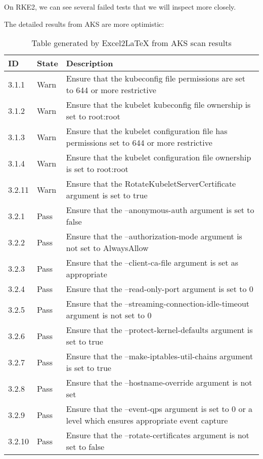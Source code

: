 On RKE2, we can see several failed tests that we will inspect more closely.

The detailed results from AKS are more optimistic:
\pagebreak

\begin{table}[hp]
  \centering
  \caption{Table generated by Excel2LaTeX from AKS scan results}
    \begin{tabular}{| l | l | p{11.6cm} |}
    \hline
    ID & State & Description \\
    \hline\hline
    3.1.1 & Warn  & Ensure that the kubeconfig file permissions are set to 644 or more restrictive \\
    \hline
    3.1.2 & Warn  & Ensure that the kubelet kubeconfig file ownership is set to root:root \\
    \hline
    3.1.3 & Warn  & Ensure that the kubelet configuration file has permissions set to 644 or more restrictive \\
    \hline
    3.1.4 & Warn  & Ensure that the kubelet configuration file ownership is set to root:root \\
    \hline
    3.2.11 & Warn  & Ensure that the RotateKubeletServerCertificate argument is set to true \\
    \hline
    3.2.1 & Pass  & Ensure that the --anonymous-auth argument is set to false \\
    \hline
    3.2.2 & Pass  & Ensure that the --authorization-mode argument is not set to AlwaysAllow \\
    \hline
    3.2.3 & Pass  & Ensure that the --client-ca-file argument is set as appropriate \\
    \hline
    3.2.4 & Pass  & Ensure that the --read-only-port argument is set to 0 \\
    \hline
    3.2.5 & Pass  & Ensure that the --streaming-connection-idle-timeout argument is not set to 0 \\
    \hline
    3.2.6 & Pass  & Ensure that the --protect-kernel-defaults argument is set to true \\
    \hline
    3.2.7 & Pass  & Ensure that the --make-iptables-util-chains argument is set to true \\
    \hline
    3.2.8 & Pass  & Ensure that the --hostname-override argument is not set \\
    \hline
    3.2.9 & Pass  & Ensure that the --event-qps argument is set to 0 or a level which ensures appropriate event capture \\
    \hline
    3.2.10 & Pass  & Ensure that the --rotate-certificates argument is not set to false \\
    \hline
    \end{tabular}%
  \label{tab:aksScan}%
\end{table}%

